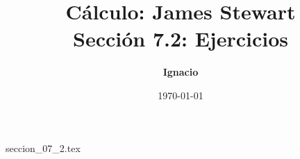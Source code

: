 \documentclass[11pt,spanish,oneside]{report}
\title{\textbf{Cálculo: James Stewart} \\ \Large Sección 7.2: Ejercicios}
\author{\textbf{Ignacio}}
\date{\today}
\begin{document}
\maketitle

{seccion_07_2.tex}
\end{document}
